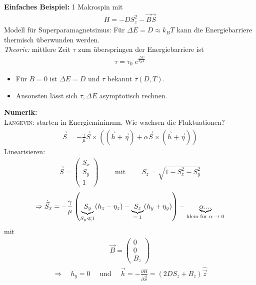 \documentclass[12pt]{article}
\begin{document}
   \textbf{Einfaches Beispiel:} 1 Makrospin mit 
   \begin{align*}
   H = -D S_z^2 - \vec{B} \vec{S}
   \end{align*}
   Modell für Superparamagnetsimus: Für $\Delta E = D \approx k_B T$ kann die Energiebarriere thermisch überwunden werden. \\
   \textit{Theorie:} mittlere Zeit $\tau$ zum überspringen der Energiebarriere ist 
\begin{align*}
\tau = \tau_0 \; e^\frac{\Delta E}{k_B T}
\end{align*}   
  \begin{itemize}
   \item Für $B=0$ ist $\Delta E = D$ und $\tau $ bekannt $\tau (D, T)$. 
    \item Ansonsten lässt sich $\tau, \Delta E$ asymptotisch rechnen.
    \end{itemize}
    \textbf{Numerik:} \\
    \textsc{Langevin:} starten in Energieminimum. Wie wachsen die Fluktuationen?
    \begin{align}
    \dot{\vec{S}} = - \frac{\gamma}{\mu} \vec{S} \times \left( ( \vec{h} +  \vec{\eta}) + \alpha  \vec{S} \times ( \vec{h} +  \vec{\eta}) \right)
    \end{align}
    Linearisieren:
    \begin{align}
     \vec{S} = \begin{pmatrix}S_x\\ S_y \\ 1 \end{pmatrix} \qquad \text{ mit } \qquad S_z = \sqrt{1- S_x^2 - S_y^2}
    \end{align}
    \begin{align}
    \Rightarrow \dot{\vec{S}}_x = - \frac{\gamma }{\mu} \left(
    \underbrace{ S_y}_{ S_y \ll 1} ( h_z - \eta_z ) - \underbrace{S_z}_\text{$=1$} (h_y + \eta_y) \right) - \underbrace{\alpha....}_\text{klein für $ \alpha \to 0$}
    \end{align}
    mit
    \begin{align}
    \vec{B} = \begin{pmatrix} 0 \\ 0 \\ B_z \end{pmatrix} \end{align}
    \begin{align}
     \Rightarrow \quad  h_y = 0 \quad \mbox{ und } \quad \vec{h}= - \frac{\partial H}{\partial \vec{S}}= (2 DS_z + B_z) \hat{\vec{z}}
    \end{align}
\end{document}
